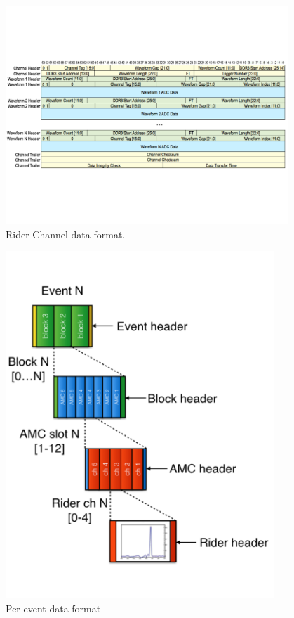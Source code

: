 \begin{figure}[htbp]
\centering
\includegraphics[trim=0cm 5.5cm 0cm 5.5cm ,width=0.95\textwidth]{pics/RiderChannelHeader}
\caption{Rider Channel data format.}
\end{figure}

\begin{figure}[htbp]
\centering
\includegraphics[width=0.9\textwidth]{pics/AllHeaders}
\caption{Per event data format}
\end{figure}


